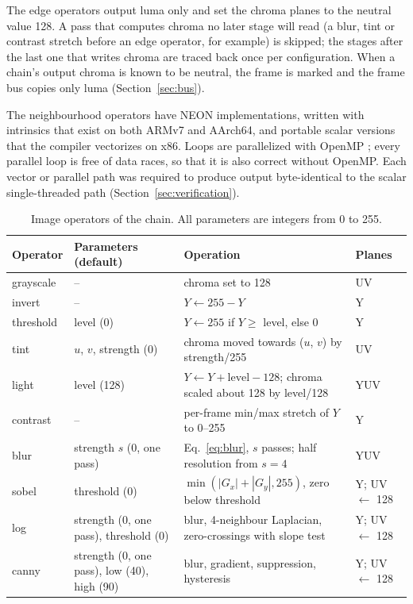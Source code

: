 The edge operators output luma only and set the chroma planes to the
neutral value
128. A pass that computes chroma no later stage will read (a blur,
  tint or contrast
stretch before an edge operator, for example) is skipped; the stages
after the last
one that writes chroma are traced back once per configuration. When a
chain's output
chroma is known to be neutral, the frame is marked and the frame bus
copies only luma
(Section~\ref{sec:bus}).

The neighbourhood operators have NEON implementations, written with
intrinsics that
exist on both ARMv7 and AArch64, and portable scalar versions that the compiler
vectorizes on x86. Loops are parallelized with OpenMP \cite{dagum1998}; every
parallel loop is free of data races, so that it is also correct
without OpenMP. Each
vector or parallel path was required to produce output byte-identical
to the scalar
single-threaded path (Section~\ref{sec:verification}).

\begin{table}[!t]
  \centering\small
  \caption{Image operators of the chain. All parameters are integers
  from 0 to 255.}\label{tab:operators}
  \setlength{\tabcolsep}{4pt}
  \begin{tabular}{@{}lL{4.2cm}L{6.4cm}l@{}}
    \toprule
    Operator & Parameters (default) & Operation & Planes \\
    \midrule
    grayscale & -- & chroma set to 128 & UV \\
    invert & -- & $Y \leftarrow 255 - Y$ & Y \\
    threshold & level (0) & $Y \leftarrow 255$ if $Y \geq$ level, else 0 & Y \\
    tint & $u$, $v$, strength (0) & chroma moved towards ($u$, $v$)
    by strength/255 & UV \\
    light & level (128) & $Y \leftarrow Y + \text{level} - 128$;
    chroma scaled about 128 by level/128 & YUV \\
    contrast & -- & per-frame min/max stretch of $Y$ to 0--255 & Y \\
    blur & strength $s$ (0, one pass) & Eq.~\eqref{eq:blur}, $s$
    passes; half resolution from $s = 4$ & YUV \\
    sobel & threshold (0) & $\min(|G_x|+|G_y|, 255)$, zero below
    threshold & Y; UV $\leftarrow$ 128 \\
    log & strength (0, one pass), threshold (0) & blur, 4-neighbour
    Laplacian, zero-crossings with slope test & Y; UV $\leftarrow$ 128 \\
    canny & strength (0, one pass), low (40), high (90) & blur,
    gradient, suppression, hysteresis & Y; UV $\leftarrow$ 128 \\
    \bottomrule
  \end{tabular}
\end{table}
